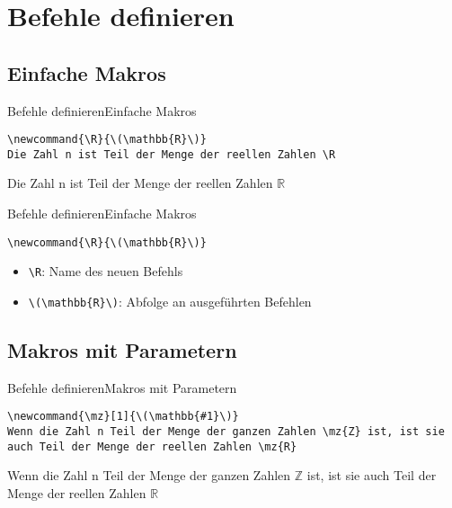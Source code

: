 \documentclass[10pt,a4paper, ngerman]{beamer}
\begin{document}
\section{Befehle definieren}
\subsection{Einfache Makros}

\begin{frame}[fragile]{Befehle definieren}{Einfache Makros}
\newcommand{\R}{\( \mathbb{R} \)}
\begin{lstlisting}[caption = newcommand]
\newcommand{\R}{\(\mathbb{R}\)}
Die Zahl n ist Teil der Menge der reellen Zahlen \R 
\end{lstlisting}
\begin{hlbox}
Die Zahl n ist Teil der Menge der reellen Zahlen \R 
\end{hlbox}
\end{frame}

\begin{frame}[fragile]{Befehle definieren}{Einfache Makros}
\begin{lstlisting}
\newcommand{\R}{\(\mathbb{R}\)}
\end{lstlisting}
\begin{itemize}
\item \lstinline|\R|: Name des neuen Befehls
\item \lstinline|\(\mathbb{R}\)|: Abfolge an ausgeführten Befehlen
\end{itemize}
\end{frame}

\subsection{Makros mit Parametern}

\begin{frame}[fragile]{Befehle definieren}{Makros mit Parametern}
\newcommand{\mz}[1]{\(\mathbb{#1}\)}
\begin{lstlisting}[caption = Mengenzeichen]
\newcommand{\mz}[1]{\(\mathbb{#1}\)}
Wenn die Zahl n Teil der Menge der ganzen Zahlen \mz{Z} ist, ist sie auch Teil der Menge der reellen Zahlen \mz{R}
\end{lstlisting}
\begin{hlbox}
Wenn die Zahl n Teil der Menge der ganzen Zahlen \mz{Z} ist, ist sie auch Teil der Menge der reellen Zahlen \mz{R}
\end{hlbox}
\end{frame}
\end{document}
